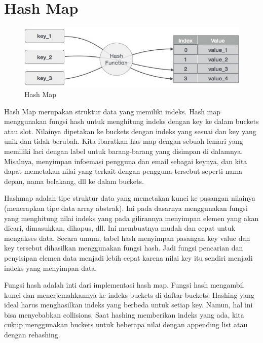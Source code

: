 \section{Hash Map}
\begin{figure}[H]
        \centerline{\includegraphics[scale=0.5]{figures/hash-map/hash-function}}
        \caption{Hash Map}
\end{figure}
Hash Map merupakan struktur data yang memiliki indeks. Hash map menggunakan fungsi hash untuk menghitung indeks dengan key ke dalam buckets atau slot. Nilainya dipetakan ke buckets dengan indeks yang sesuai dan key yang unik dan tidak berubah. Kita ibaratkan has map dengan sebuah lemari yang memiliki laci dengan label untuk barang-barang yang disimpan di dalamnya. Misalnya, menyimpan infoemasi pengguna dan email sebagai keynya, dan kita dapat memetakan nilai yang terkait dengan pengguna tersebut seperti nama depan, nama belakang, dll ke dalam buckets.

Hashmap adalah tipe struktur data yang memetakan kunci ke pasangan nilainya (menerapkan tipe data array abstrak). Ini pada dasarnya menggunakan fungsi yang menghitung nilai indeks yang pada gilirannya menyimpan elemen yang akan dicari, dimasukkan, dihapus, dll. Ini membuatnya mudah dan cepat untuk mengakses data. Secara umum, tabel hash menyimpan pasangan key value dan key tersebut dihasilkan menggunakan fungsi hash. Jadi fungsi pencarian dan penyisipan elemen data menjadi lebih cepat karena nilai key itu sendiri menjadi indeks yang menyimpan data.

Fungsi hash adalah inti dari implementasi hash map. Fungsi hash mengambil kunci dan menerjemahkannya ke indeks buckets di daftar buckets. Hashing yang ideal harus menghasilkan indeks yang berbeda untuk setiap key. Namun, hal ini bisa menyebabkan collisions. Saat hashing memberikan indeks yang ada, kita cukup menggunakan buckets untuk beberapa nilai dengan appending list atau dengan rehashing.

